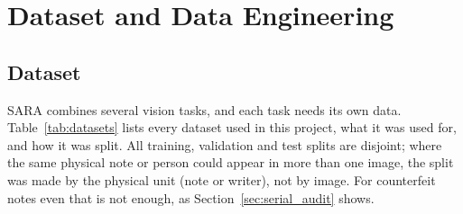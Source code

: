 \clearpage
\chapter{Dataset and Data Engineering}
\label{chap:dataset}

\section{Dataset}
SARA combines several vision tasks, and each task needs its own data. Table~\ref{tab:datasets} lists every dataset used in this project, what it was used for, and how it was split. All training, validation and test splits are disjoint; where the same physical note or person could appear in more than one image, the split was made by the physical unit (note or writer), not by image. For counterfeit notes even that is not enough, as Section~\ref{sec:serial_audit} shows.

